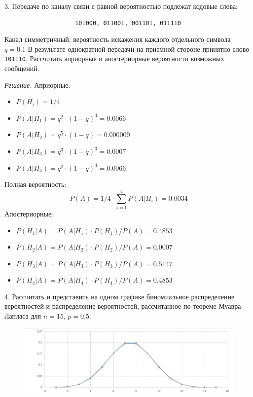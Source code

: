 \documentclass[a4paper,12pt]{article}
\begin{document}
    3. Передаче по каналу связи с равной вероятностью подлежат кодовые слова:
    \begin{verbatim}
                    101000, 011001, 001101, 011110
    \end{verbatim}
    Канал симметричный, вероятность искажения каждого отдельного символа $q = 0.1$
    В результате однократной передачи на приемной стороне принятно слово \verb|101110|.
    Рассчитать априорные и апостериорные вероятности возможных сообщений.
    
    \textit{Решение.} Априорные:
    \begin{itemize}
        \item[] $\displaystyle P(H_i) = 1/4$
        \item $\displaystyle P(A|H_1) = q^2 \cdot (1-q)^4 = 0.0066$
        \item $\displaystyle P(A|H_2) = q^5 \cdot (1-q) = 0.000009$
        \item $\displaystyle P(A|H_3) = q^3 \cdot (1-q)^3 = 0.0007$
        \item $\displaystyle P(A|H_4) = q^2 \cdot (1-q)^4 = 0.0066$
    \end{itemize}
    Полная вероятность:
    \begin{equation*}
        P(A) = 1/4 \cdot \sum_{i=1}^4 P(A|H_i) = 0.0034
    \end{equation*}
    Апостериорные:
    \begin{itemize}
        \item $\displaystyle P(H_1|A) = P(A|H_1) \cdot P(H_1) / P(A) = 0.4853$
        \item $\displaystyle P(H_2|A) = P(A|H_2) \cdot P(H_2) / P(A) = 0.0007$
        \item $\displaystyle P(H_3|A) = P(A|H_3) \cdot P(H_3) / P(A) = 0.5147$
        \item $\displaystyle P(H_4|A) = P(A|H_4) \cdot P(H_4) / P(A) = 0.4853$
    \end{itemize}
    \vspace{1cm}

    4. Рассчитать и представить на одном графике биномиальное распределение вероятностей и распределение
    вероятностей, рассчитанное по теореме Муавра-Лапласа для $n = 15, \, p = 0.5$.
    \begin{figure}[H]
        \centering
        \includegraphics[width=\linewidth]{polytech/stats/homework-1/subfiles/images/graph}
    \end{figure}
\end{document}
